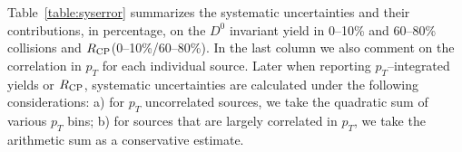 \documentclass[%
 reprint,	
 amsmath,amssymb,
 aps,
 prc,
]{revtex4-1}
\begin{document}
\begin{table}
\label{table:syserror}
\end{table}


Table~\ref{table:syserror} summarizes the systematic uncertainties and their contributions, in percentage, on the $D^0$ invariant yield in 0--10\% and 60--80\% collisions and $R_{\rm CP}$(0--10\%/60--80\%). In the last column we also comment on the correlation in $p_{T}$ for each individual source. Later when reporting $p_{T}$--integrated yields or $R_{\rm CP}$, systematic uncertainties are calculated under the following considerations: a) for $p_{T}$ uncorrelated sources, we take the quadratic sum of various $p_{T}$ bins; b) for sources that are largely correlated in $p_{T}$, we take the arithmetic sum as a conservative estimate.
\end{document}
